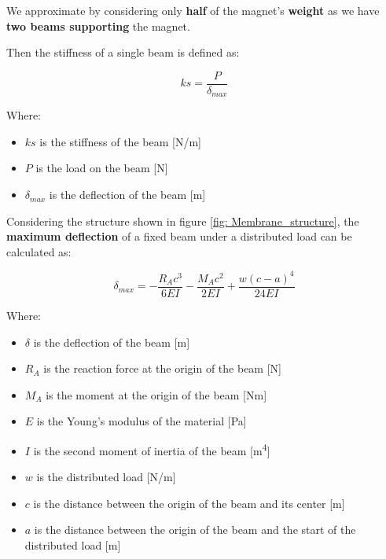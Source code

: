 We approximate by considering only \textbf{half} of the magnet's \textbf{weight} as we have \textbf{two beams supporting} the magnet.

\begin{samepage}
    Then the stiffness of a single beam is defined as:
    \nopagebreak

    \begin{equation*}
        ks = \frac{P}{\delta_{max}}
    \end{equation*}
    \nopagebreak

    Where:
    \nopagebreak

    \begin{itemize}
        \item $ks$ is the stiffness of the beam [N/m]
        \item $P$ is the load on the beam [N]
        \item $\delta_{max}$ is the deflection of the beam [m]
    \end{itemize}
\end{samepage}

\begin{samepage}
    Considering the structure shown in figure \ref{fig: Membrane_structure}, the \textbf{maximum deflection} of a fixed beam under a distributed load can be calculated as:
    \nopagebreak

    \begin{equation}
        \delta_{max} = -\frac{R_A c^3}{6 E I} - \frac{M_A c^2}{2EI} + \frac{w (c-a)^4}{24 EI}
        \label{eq: Beam_deflection}
    \end{equation}
    \nopagebreak

    Where:
    \nopagebreak

    \begin{itemize}
        \item $\delta$ is the deflection of the beam [m]
        \item $R_A$ is the reaction force at the origin of the beam [N]
        \item $M_A$ is the moment at the origin of the beam [Nm]
        \item $E$ is the Young's modulus of the material [Pa]
        \item $I$ is the second moment of inertia of the beam [m\textsuperscript{4}]
        \item $w$ is the distributed load [N/m]
        \item $c$ is the distance between the origin of the beam and its center [m]
        \item $a$ is the distance between the origin of the beam and the start of the distributed load [m]
    \end{itemize}
\end{samepage}

